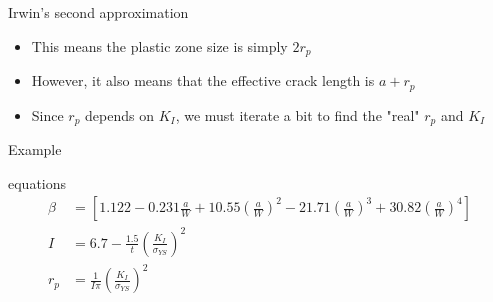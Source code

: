 \documentclass[10pt,handout]{beamer}
\begin{document}
\begin{frame}{Irwin's second approximation}
	\begin{itemize}
		\item This means the plastic zone size is simply $2r_p$
		\item However, it also means that the effective crack length is $a + r_p$
		\pause
		\item Since $r_p$ depends on $K_I$, we must iterate a bit to find the "real" $r_p$ and $K_I$
	\end{itemize}
\end{frame}

\begin{frame}{Example}
	\begin{figure}[H]
		\centering
	\end{figure}
\end{frame}

\begin{frame}{equations}
	\begin{align}
	\beta &= \left[1.122 - 0.231 \frac{a}{W} + 10.55 \left(\frac{a}{W}\right)^2 - 21.71 \left(\frac{a}{W}\right)^3 + 30.82 \left(\frac{a}{W}\right)^4\right] \tag{2.4a}\\
	I &= 6.7 - \frac{1.5}{t}\left(\frac{K_I}{\sigma_{YS}}\right)^2 \tag{4.13}\\
	r_p &= \frac{1}{I\pi} \left(\frac{K_I}{\sigma_{YS}}\right)^2 \tag{4.12}
	\end{align} 
\end{frame}
\end{document}

